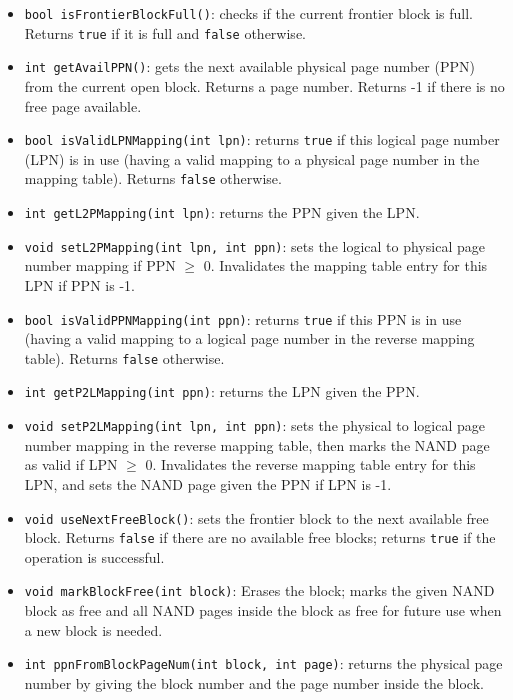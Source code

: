 \documentclass[11pt]{article}
\begin{document}
\begin{itemize}
    \item \texttt{bool isFrontierBlockFull()}: checks if the current frontier block is full. Returns \texttt{true} if it is full and \texttt{false} otherwise.
    \item \texttt{int getAvailPPN()}: gets the next available physical page number (PPN) from the current open block. Returns a page number. Returns -1 if there is no free page available.
    
    \item \texttt{bool isValidLPNMapping(int lpn)}: returns \texttt{true} if this logical page number (LPN) is in use (having a valid mapping to a physical page number in the mapping table). Returns \texttt{false} otherwise.
    \item \texttt{int getL2PMapping(int lpn)}: returns the PPN given the LPN. 
    \item \texttt{void setL2PMapping(int lpn, int ppn)}: sets the logical to physical page number mapping if PPN $\geq$ 0. Invalidates the mapping table entry for this LPN if PPN is -1. 

    \item \texttt{bool isValidPPNMapping(int ppn)}: returns \texttt{true} if this PPN is in use (having a valid mapping to a logical page number in the reverse mapping table). Returns \texttt{false} otherwise.
    \item \texttt{int getP2LMapping(int ppn)}: returns the LPN given the PPN. 
    \item \texttt{void setP2LMapping(int lpn, int ppn)}: sets the physical to logical page number mapping in the reverse mapping table, then marks the NAND page as valid if LPN $\geq$ 0. 
    Invalidates the reverse mapping table entry for this LPN, and sets the NAND page given the PPN if LPN is -1. 

    \item \texttt{void useNextFreeBlock()}: sets the frontier block to the next available free block. Returns \texttt{false} if there are no available free blocks; returns \texttt{true} if the operation is successful. 
    \item \texttt{void markBlockFree(int block)}: Erases the block; marks the given NAND block as free and all NAND pages inside the block as free for future use when a new block is needed.

    \item \texttt{int ppnFromBlockPageNum(int block, int page)}: returns the physical page number by giving the block number and the page number inside the block.


\end{itemize}
\end{document}
